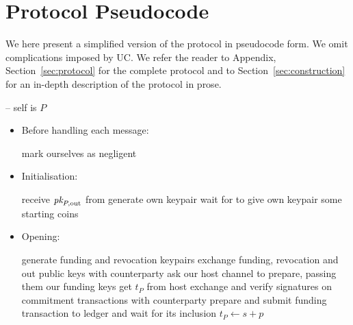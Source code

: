 \section{Protocol Pseudocode}
\label{sec:pseudocode}

We here present a simplified version of the protocol in pseudocode form. We omit
complications imposed by UC. We refer the reader to Appendix,
Section~\ref{sec:protocol} for the complete protocol and to
Section~\ref{sec:construction} for an in-depth description of the protocol in
prose.
\ \\

\begin{center}
  \begin{processbox}{\pchan -- self is $P$}
    \begin{itemize}
      \item Before handling each message:
      \begin{algorithmic}[0]
          \State mark ourselves as negligent 
        \EndIf
      \end{algorithmic}

      \item Initialisation:
      \begin{algorithmic}[0]
        \State receive $\textit{pk}_{P, \mathrm{out}}$ from \environment {}
        \State generate own keypair
        \State wait for \environment to give own keypair some starting coins
      \end{algorithmic}

      \item Opening:
      \begin{algorithmic}[0]
        \State generate funding and revocation keypairs
        \State exchange funding, revocation and out public keys with
        counterparty
          \State ask our host channel to prepare, passing them our funding keys
          \State get $t_P$ from host 
        \EndIf
        \State exchange and verify signatures on commitment transactions with
        counterparty
          \State prepare and submit funding transaction to ledger and wait for
          its inclusion 
          \State $t_P \gets s + p$ 
        \EndIf
      \end{algorithmic}


\end{itemize}
\end{processbox}
\end{center}

